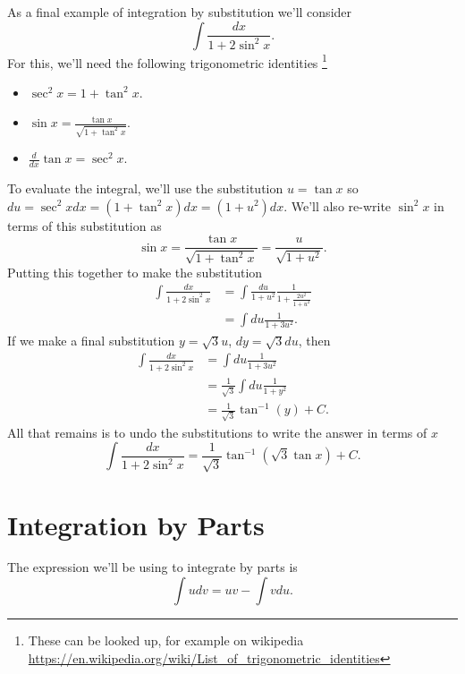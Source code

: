 \documentclass{article}
\begin{document}
As a final example of integration by substitution we'll consider 
\begin{equation}
	\int \frac{dx}{1 + 2 \sin^2 x}.
\end{equation}
For this, we'll need the following trigonometric identities \footnote{These can be looked up, for example on wikipedia \url{https://en.wikipedia.org/wiki/List_of_trigonometric_identities}}
\begin{itemize}
	\item{$\sec^2 x = 1 + \tan^2 x$.}
	\item{$\sin x = \frac{\tan x}{\sqrt{1 + \tan^2 x}}$.}
	\item{$\frac{d}{dx} \tan x = \sec^2 x$.}
\end{itemize}
To evaluate the integral, we'll use the substitution $u = \tan x$ so $du = \sec^2 x dx = (1 + \tan^2 x) dx = (1 + u^2) dx$.
We'll also re-write $\sin^2 x$ in terms of this substitution as
\begin{equation*}
	\sin x = \frac{\tan x}{\sqrt{1 + \tan^2 x}} = \frac{u}{\sqrt{1 + u^2}}.
\end{equation*}
Putting this together to make the substitution
\begin{align*}
	\int \frac{dx}{1 + 2 \sin^2 x} &= \int \frac{du}{1 + u^2} \frac{1}{1 + \frac{2u^2}{1+u^2}} \\
	&= \int du \frac{1}{1 + 3 u^2} .
\end{align*}
If we make a final substitution $y = \sqrt{3} u$, $dy = \sqrt{3} du$, then
\begin{align*}
	\int \frac{dx}{1 + 2 \sin^2 x} &= \int du \frac{1}{1 + 3 u^2} \\
	&= \frac{1}{\sqrt{3}} \int du \frac{1}{1 + y^2} \\
	&= \frac{1}{\sqrt{3}} \tan^{-1} (y) + C.
\end{align*}
All that remains is to undo the substitutions to write the answer in terms of $x$
\begin{equation*}
	\int \frac{dx}{1 + 2 \sin^2 x} = \frac{1}{\sqrt{3}} \tan^{-1} (\sqrt{3} \tan x) + C.
\end{equation*}

\section{Integration by Parts}

The expression we'll be using to integrate by parts is 
\begin{equation*}
	\int u dv = uv - \int v du .
\end{equation*}
\end{document}
